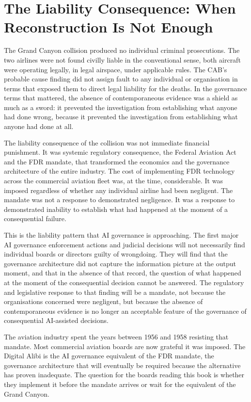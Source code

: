 \scenebreak

\section{The Liability Consequence: When Reconstruction Is Not Enough}

The Grand Canyon collision produced no individual criminal prosecutions. The two airlines were not found civilly liable in the conventional sense, both aircraft were operating legally, in legal airspace, under applicable rules. The CAB's probable cause finding did not assign fault to any individual or organisation in terms that exposed them to direct legal liability for the deaths. In the governance terms that mattered, the absence of contemporaneous evidence was a shield as much as a sword: it prevented the investigation from establishing what anyone had done wrong, because it prevented the investigation from establishing what anyone had done at all.

The liability consequence of the collision was not immediate financial punishment. It was systemic regulatory consequence, the Federal Aviation Act and the FDR mandate, that transformed the economics and the governance architecture of the entire industry. The cost of implementing FDR technology across the commercial aviation fleet was, at the time, considerable. It was imposed regardless of whether any individual airline had been negligent. The mandate was not a response to demonstrated negligence. It was a response to demonstrated inability to establish what had happened at the moment of a consequential failure.

This is the liability pattern that AI governance is approaching. The first major AI governance enforcement actions and judicial decisions will not necessarily find individual boards or directors guilty of wrongdoing. They will find that the governance architecture did not capture the information picture at the output moment, and that in the absence of that record, the question of what happened at the moment of the consequential decision cannot be answered. The regulatory and legislative response to that finding will be a mandate, not because the organisations concerned were negligent, but because the absence of contemporaneous evidence is no longer an acceptable feature of the governance of consequential AI-assisted decisions.

The aviation industry spent the years between 1956 and 1958 resisting that mandate. Most commercial aviation boards are now grateful it was imposed. The Digital Alibi is the AI governance equivalent of the FDR mandate, the governance architecture that will eventually be required because the alternative has proven inadequate. The question for the boards reading this book is whether they implement it before the mandate arrives or wait for the equivalent of the Grand Canyon.

